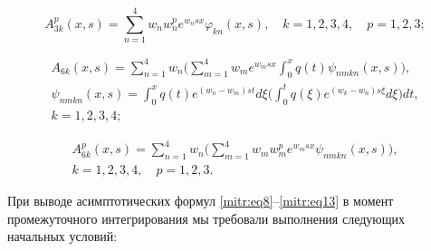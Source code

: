 \begin{lemma}[2]
\begin{equation}
\end{equation}

\begin{equation}

\label{mitr:eq11}

A^p_{3k}(x,s)=\sum^4_{n=1} w_n w^p_n e^{w_nsx}\varphi_{kn} (x,s), \quad k=1, 2, 3, 4, \quad p=1, 2, 3;

\end{equation}

\begin{equation}

\label{mitr:eq12}

\begin{gathered}

A_{6k}(x,s)=\sum^4_{n=1} w_n \biggl(\sum^4_{m=1} w_m

 e^{w_msx}\int ^x_0 q(t) \psi_{nmkn}(x,s)\biggr),  \\

\psi_{nmkn}(x,s)= \int ^x_0 q(t)

e^{(w_n-w_m)st} d\xi

\biggl(\int ^t_0q(\xi) e^{(w_k-w_n)s\xi}d\xi\biggr) dt, \\

k=1, 2, 3, 4;

\end{gathered}

\end{equation}

\begin{equation}

\label{mitr:eq13}

\begin{gathered}

A^p_{6k}(x,s)=\sum^4_{n=1} w_n \biggl(\sum^4_{m=1}w_m w^p_m e^{w_msx}

\psi_{nmkn}(x,s)\biggr), \\ k=1,2,3,4, \quad p=1, 2, 3.

\end{gathered}

\end{equation}



\end{lemma}



\smallskip



При выводе асимптотических формул \eqref{mitr:eq8}--\eqref{mitr:eq13} в момент промежуточного интегрирования мы требовали выполнения следующих начальных условий:

